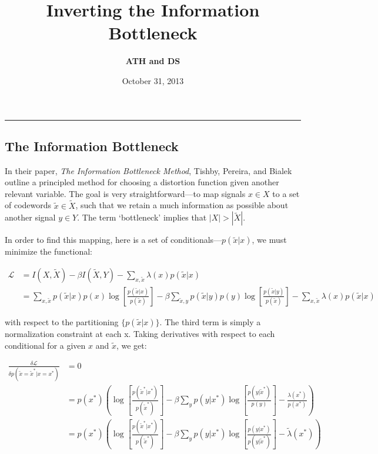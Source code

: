 \documentclass{article}
\title{Inverting the Information Bottleneck}
\author{\textbf{ATH and DS} \\}
\date{October 31, 2013}
\newcommand{\pa}{\delta}
\newcommand{\lp}{\left(}
\newcommand{\rp}{\right)}
\newcommand{\lb}{\left[}
\newcommand{\rb}{\right]}
\newcommand{\xtilde}{\tilde{x}}
\newcommand{\Xtilde}{\tilde{X}}
\newcommand{\pcx}{p\lp \xtilde | x \rp}
\newcommand{\px}{p\lp x \rp}
\newcommand{\ptx}{p\lp \xtilde \rp}
\newcommand{\Lagr}{\mathcal{L}}
\newcommand{\B}{\beta}
\newcommand{\logpcxptx}{\log{\lb \frac{\pcx}{\ptx} \rb}}
\newcommand{\pcy}{p\lp \xtilde | y \rp}
\newcommand{\py}{p\lp y \rp}
\newcommand{\logpcyptx}{\log{\lb \frac{\pcy}{\ptx} \rb}}
\newcommand{\pcxI}{p\lp \xtilde = \xtilde^* | x = x^* \rp}
\newcommand{\pcxi}{p\lp \xtilde^* | x^* \rp}
\newcommand{\pxi}{p\lp x^* \rp}
\newcommand{\ptxi}{p\lp \xtilde^* \rp}
\newcommand{\logpcxptxi}{\log{\lb \frac{\pcxi}{\ptxi} \rb}}
\newcommand{\pyxi}{p\lp y | x^* \rp}
\newcommand{\logpycpyi}{\log{\lb \frac{p\lp y | \xtilde^*\rp}{\py} \rb}}
\begin{document}
\maketitle

\captionsetup{labelfont=bf, font=footnotesize}

 


 

\vspace{10pt}

\hrule  %

\vspace{10pt}

 


\subsection*{The Information Bottleneck}
In their paper, \emph{The Information Bottleneck Method}, Tishby, Pereira, and Bialek outline a principled method for choosing a distortion function given another relevant variable.  The goal is very straightforward---to map signals $x \in X$ to a set of codewords $\xtilde \in \Xtilde$, such that we retain a much information as possible about another signal $y \in Y$.  The term `bottleneck' implies that $|X| > |\Xtilde|$.

In order to find this mapping, here is a set of conditionals---$\pcx$, we must minimize the functional:

\begin{align}
\Lagr &= I(X,\Xtilde) - \B I(\Xtilde,Y) - \sum_{x,\xtilde}\lambda(x)\pcx \nonumber \\
	 &= \sum_{x,\xtilde} \pcx \px \logpcxptx - \B\sum_{\xtilde,y} \pcy \py \logpcyptx - \sum_{x,\xtilde}\lambda(x)\pcx
\end{align}

with respect to the partitioning $\{\pcx\}$.  The third term is simply a normalization constraint at each x.  Taking derivatives with respect to each conditional for a given $x$ and $\xtilde$, we get:

\begin{align}
\label{eq:functional}
\frac{\pa \Lagr}{\pa \pcxI} & = 0 \nonumber \\
& = \pxi \lp \logpcxptxi - \B \sum_{y} \pyxi \logpycpyi - \frac{\lambda(x^*)}{\pxi}  \rp \nonumber \\
& = \pxi \lp \logpcxptxi - \B \sum_{y} \pyxi \log{\lb\frac{p\lp y | x^* \rp}{p\lp y | \xtilde^* \rp}\rb} - \tilde{\lambda}(x^*)  \rp
\end{align}
\end{document}
